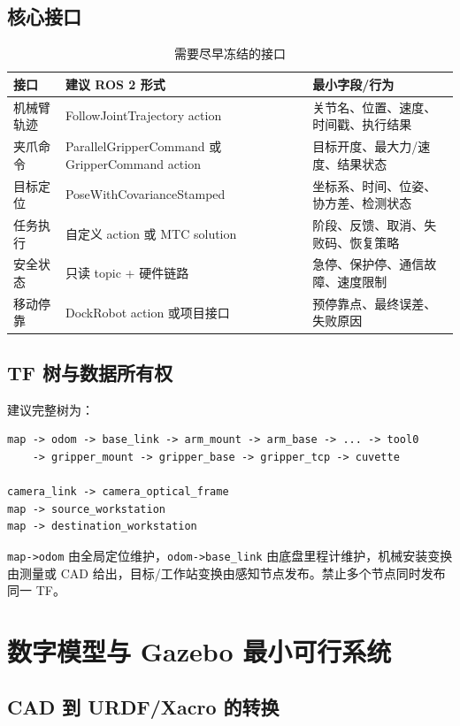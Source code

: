 \documentclass[UTF8,12pt,oneside]{ctexrep}
\begin{document}
\section{核心接口}

\begin{table}[H]
\centering
\caption{需要尽早冻结的接口}
\begin{tabularx}{\textwidth}{L{3cm}L{4cm}Y}
\toprule
接口 & 建议 ROS 2 形式 & 最小字段/行为 \\
\midrule
机械臂轨迹 & FollowJoint\-Trajectory action & 关节名、位置、速度、时间戳、执行结果 \\
夹爪命令 & ParallelGripper\-Command 或 Gripper\-Command action & 目标开度、最大力/速度、结果状态 \\
目标定位 & PoseWithCovariance\-Stamped & 坐标系、时间、位姿、协方差、检测状态 \\
任务执行 & 自定义 action 或 MTC solution & 阶段、反馈、取消、失败码、恢复策略 \\
安全状态 & 只读 topic + 硬件链路 & 急停、保护停、通信故障、速度限制 \\
移动停靠 & Dock\-Robot action 或项目接口 & 预停靠点、最终误差、失败原因 \\
\bottomrule
\end{tabularx}
\end{table}

\section{TF 树与数据所有权}

建议完整树为：

\begin{lstlisting}
map -> odom -> base_link -> arm_mount -> arm_base -> ... -> tool0
    -> gripper_mount -> gripper_base -> gripper_tcp -> cuvette

camera_link -> camera_optical_frame
map -> source_workstation
map -> destination_workstation
\end{lstlisting}

\texttt{map->odom} 由全局定位维护，\texttt{odom->base\_link} 由底盘里程计维护，机械安装变换由测量或 CAD 给出，目标/工作站变换由感知节点发布。禁止多个节点同时发布同一 TF。

\chapter{数字模型与 Gazebo 最小可行系统}

\section{CAD 到 URDF/Xacro 的转换}
\end{document}

